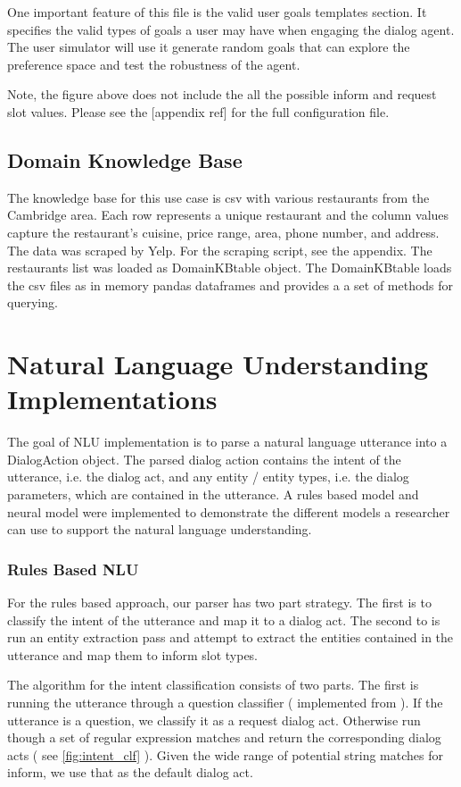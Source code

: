One important feature of this file is the valid user goals templates section. It specifies the valid types of goals a user may have when engaging the dialog agent. The user simulator will use it generate random goals that can explore the preference space and test the robustness of the agent. 

Note, the figure above does not include the all the possible inform and request slot values. Please see the [appendix ref] for the full configuration file.  

\subsection{Domain Knowledge Base }

The knowledge base for this use case is csv with various restaurants from the Cambridge area. Each row represents a unique restaurant and the column values capture the restaurant's cuisine, price range, area, phone number, and address. The data was scraped by Yelp. For the scraping script, see the appendix. The restaurants list was loaded as DomainKBtable object. The DomainKBtable loads the csv files as in memory pandas dataframes and provides a a set of methods for querying. 

\section{Natural Language Understanding Implementations}

The goal of NLU implementation is to parse a natural language utterance into a DialogAction object. The parsed dialog action contains the intent of the utterance, i.e. the dialog act, and any entity / entity types, i.e. the dialog parameters, which are contained in the utterance. A rules based model and neural model were implemented to demonstrate the different models a researcher can use to support the natural language understanding. 

\subsubsection{Rules Based NLU}

For the rules based approach, our parser has two part strategy. The first is to classify the intent of the utterance and map it to a dialog act. The second to is run an entity extraction pass and attempt to extract the entities contained in the utterance and map them to inform slot types. 

The algorithm for the intent classification consists of two parts. The first is running the utterance through a question classifier ( implemented from \cite{chewning_lord_yarvis_2015} ). If the utterance is a question, we classify it as a request dialog act. Otherwise run though a set of regular expression matches and return the corresponding dialog acts ( see \ref{fig:intent_clf} ). Given the wide range of potential string matches for inform, we use that as the default dialog act. 

